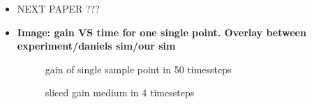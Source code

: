 \begin{itemize}

  \item NEXT PAPER ???

  \item \textbf{Image: gain VS time for one single point. Overlay between
    experiment/daniels sim/our sim}
    \begin{figure}[H]
      \centerline{
        }
      \caption{gain of single sample point in 50 timessteps}
      \label{plot:benchmark}
    \end{figure}
    \begin{figure}[H]
      \centerline{
        }
      \caption{sliced gain medium in 4 timessteps}
      \label{plot:benchmark}
    \end{figure}


\end{itemize}

